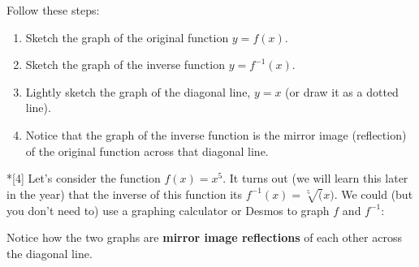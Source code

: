 \documentclass[fleqn,letterpaper,12pt,printwatermark=false]{memoir}
\begin{document}



\begin{myKeyConcepts}
    Follow these steps:
    \begin{enumerate}
        \item Sketch the graph of the original function $y = f(x)$.
        \item Sketch the graph of the inverse function $y = f^{-1}(x)$.
        \item Lightly sketch the graph of the diagonal line, $y=x$ (or draw it as a dotted line).
        \item Notice that the graph of the inverse function 
        is the mirror image (reflection) of the original function 
        across that diagonal line.
    \end{enumerate}
\end{myKeyConcepts}

\begin{myExampleForTikzGraphs}*[4]{
    Let's consider the function 
    \( f(x) = x^5 \).
    It turns out (we will learn this later in the year)
    that the inverse of this function its
    \( f^{-1}(x) = \sqrt[5](x) \).
}
    We could (but you don't need to) use a graphing calculator or Desmos to graph $f$ and $f^{-1}$:

    \begin{center}
    \end{center}
    
    \noindent Notice how the two graphs are {\bfseries mirror image reflections} of each other 
    across the diagonal line.
\end{myExampleForTikzGraphs}

  
\end{document}
